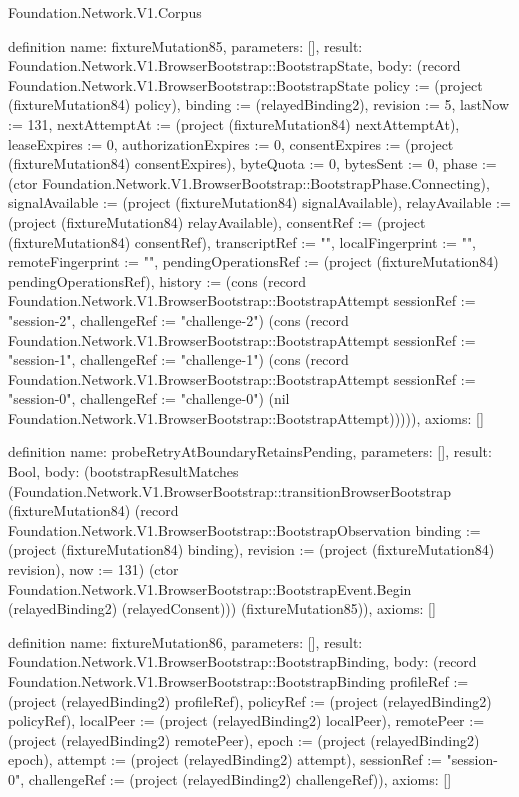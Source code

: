\begin{lexlean}{Foundation.Network.V1.Corpus}
\begin{semanticmodule}
definition{
  name: fixtureMutation85,
  parameters: [],
  result: Foundation.Network.V1.BrowserBootstrap::BootstrapState,
  body: (record Foundation.Network.V1.BrowserBootstrap::BootstrapState {policy := (project (fixtureMutation84) policy), binding := (relayedBinding2), revision := 5, lastNow := 131, nextAttemptAt := (project (fixtureMutation84) nextAttemptAt), leaseExpires := 0, authorizationExpires := 0, consentExpires := (project (fixtureMutation84) consentExpires), byteQuota := 0, bytesSent := 0, phase := (ctor Foundation.Network.V1.BrowserBootstrap::BootstrapPhase.Connecting), signalAvailable := (project (fixtureMutation84) signalAvailable), relayAvailable := (project (fixtureMutation84) relayAvailable), consentRef := (project (fixtureMutation84) consentRef), transcriptRef := "", localFingerprint := "", remoteFingerprint := "", pendingOperationsRef := (project (fixtureMutation84) pendingOperationsRef), history := (cons (record Foundation.Network.V1.BrowserBootstrap::BootstrapAttempt {sessionRef := "session-2", challengeRef := "challenge-2"}) (cons (record Foundation.Network.V1.BrowserBootstrap::BootstrapAttempt {sessionRef := "session-1", challengeRef := "challenge-1"}) (cons (record Foundation.Network.V1.BrowserBootstrap::BootstrapAttempt {sessionRef := "session-0", challengeRef := "challenge-0"}) (nil Foundation.Network.V1.BrowserBootstrap::BootstrapAttempt))))}),
  axioms: []
}

definition{
  name: probeRetryAtBoundaryRetainsPending,
  parameters: [],
  result: Bool,
  body: (bootstrapResultMatches (Foundation.Network.V1.BrowserBootstrap::transitionBrowserBootstrap (fixtureMutation84) (record Foundation.Network.V1.BrowserBootstrap::BootstrapObservation {binding := (project (fixtureMutation84) binding), revision := (project (fixtureMutation84) revision), now := 131}) (ctor Foundation.Network.V1.BrowserBootstrap::BootstrapEvent.Begin (relayedBinding2) (relayedConsent))) (fixtureMutation85)),
  axioms: []
}

definition{
  name: fixtureMutation86,
  parameters: [],
  result: Foundation.Network.V1.BrowserBootstrap::BootstrapBinding,
  body: (record Foundation.Network.V1.BrowserBootstrap::BootstrapBinding {profileRef := (project (relayedBinding2) profileRef), policyRef := (project (relayedBinding2) policyRef), localPeer := (project (relayedBinding2) localPeer), remotePeer := (project (relayedBinding2) remotePeer), epoch := (project (relayedBinding2) epoch), attempt := (project (relayedBinding2) attempt), sessionRef := "session-0", challengeRef := (project (relayedBinding2) challengeRef)}),
  axioms: []
}


\end{semanticmodule}
\end{lexlean}
